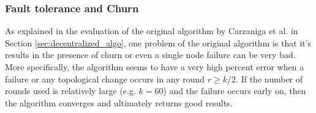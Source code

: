 \documentclass[a4paper,11pt,twoside]{report}
\begin{document}
\subsubsection*{Fault tolerance and Churn}

As explained in the evaluation of the original algorithm by Carzaniga et al. in Section \ref{sec:decentralized_algo}, one problem of the original algorithm is that it's results in the presence of churn or even a single node failure can be very bad. More specifically, the algorithm seems to have a very high percent error when a failure or any topological change occurs in any round $r \ge k/2$. If the number of rounds used is relatively large (e.g. $k=60$) and the failure occurs early on, then the algorithm converges and ultimately returns good results.\\
\end{document}
